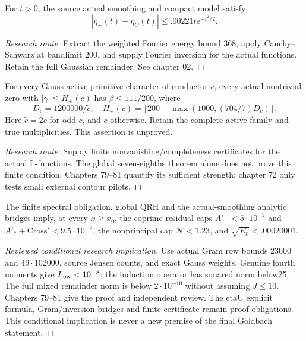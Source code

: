 \begin{theorem}\label{smoothing}\notready
For $t>0$, the source actual smoothing and compact model satisfy
\[|\eta_+(t)-\eta_O(t)|\le .00221t e^{-t^2/2}.\]
\end{theorem}
\begin{proof}[Research route]
Extract the weighted Fourier energy bound $368$, apply Cauchy--Schwarz at
bandlimit $200$, and supply Fourier inversion for the actual functions.
Retain the full Gaussian remainder. See chapter 02.
\end{proof}

\begin{theorem}\label{finitespectral}\notready
For every Gauss-active primitive character of conductor $c$, every actual
nontrivial zero with $|\gamma|\le H_+(c)$ has $\beta\le111/200$, where
\[D_c=1200000/\widetilde c,\quad
 H_+(c)=\lceil200+\max(1000,(704/7)D_c)\rceil.\]
Here $\widetilde c=2c$ for odd $c$, and $c$ otherwise. Retain the complete
active family and true multiplicities. This assertion is unproved.
\end{theorem}
\begin{proof}[Research route]
Supply finite nonvanishing/completeness certificates for the actual
L-functions. The global seven-eighths theorem alone does not prove this
finite condition. Chapters 79--81 quantify its sufficient strength;
chapter 72 only tests small external contour pilots.
\end{proof}

\begin{theorem}\label{familymoments}\notready
The finite spectral obligation, global QRH and the actual-smoothing
analytic bridges imply, at every $x\ge x_0$, the coprime residual caps
$A'_+<5\cdot10^{-7}$ and $A'_*+\mathrm{Cross}'<9.5\cdot10^{-7}$,
the nonprincipal cap $\mathcal N<1.23$, and
$\sqrt{E_p}<.00020001$.
\end{theorem}
\begin{proof}[Reviewed conditional research implication]
Use actual Gram row bounds 23000 and $49\cdot102000$, source Jensen
counts, and exact Gauss weights. Genuine fourth moments give
$I_{\rm low}<10^{-8}$; the induction operator has squared norm below25.
The full mixed remainder norm is below $2\cdot10^{-10}$ without assuming
$J\le10$. Chapters 79--81 give the proof and independent review.
The etaU explicit formula, Gram/inversion bridges and finite certificate
remain proof obligations. This conditional implication is never a new
premise of the final Goldbach statement.
\end{proof}

